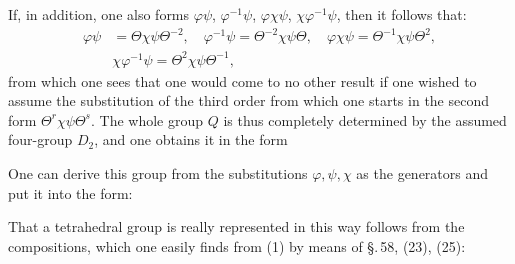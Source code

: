 If, in addition, one also forms $\varphi\psi$, $\varphi^{-1}\psi$, $\varphi\chi\psi$, $\chi\varphi^{-1}\psi$, then it follows that:
\[
\begin{aligned}
\varphi\psi &= \Theta\chi\psi\Theta^{-2}, \quad \varphi^{-1}\psi = \Theta^{-2}\chi\psi\Theta, \quad \varphi\chi\psi = \Theta^{-1}\chi\psi\Theta^2, \\
&\chi\varphi^{-1}\psi = \Theta^2\chi\psi\Theta^{-1},
\end{aligned}
\]
from which one sees that one would come to no other result if one wished to assume the substitution of the third order from which one starts in the second form $\Theta^r\chi\psi\Theta^s$. The whole group $Q$ is thus completely determined by the assumed four-group $D_2$, and one obtains it in the form

One can derive this group from the substitutions $\varphi, \psi, \chi$ as the generators and put it into the form:

That a tetrahedral group is really represented in this way follows from the compositions, which one easily finds from (1) by means of \S.\,58, (23), (25):

